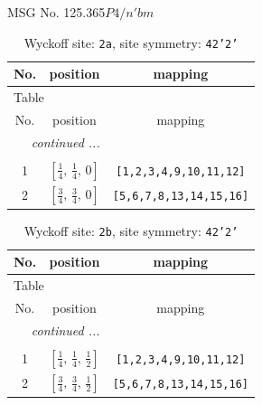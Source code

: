 \documentclass[fleqn,8pt]{jsarticle}
\begin{document}
\setcounter{MaxMatrixCols}{32}

\renewcommand{\tablename}{Table~}
\renewcommand{\figurename}{Figure~}
\begin{center}
\LARGE
MSG No. 125.365\quad$P4/n'bm$
\end{center}
\renewcommand{\arraystretch}{1.2}
\begin{longtable}{ccc}
\caption{Wyckoff site: {\tt 2a}, site symmetry: {\tt 42'2'}}
 \\
 \hline \hline
No. & position & mapping \\ \hline \endfirsthead

\multicolumn{2}{l}{\tablename\ \thetable{}} \\
 \hline \hline
No. & position & mapping \\ \hline \endhead

 \hline \hline
\multicolumn{2}{r}{\footnotesize\it continued ...} \\ \endfoot

 \hline \hline
\multicolumn{2}{r}{} \\ \endlastfoot

1 & $\left[ \frac{1}{4},\, \frac{1}{4},\, 0 \right]$ & {\tt [1,2,3,4,9,10,11,12]} \\ \hline
2 & $\left[ \frac{3}{4},\, \frac{3}{4},\, 0 \right]$ & {\tt [5,6,7,8,13,14,15,16]} \\
\end{longtable}
\renewcommand{\arraystretch}{1.2}
\begin{longtable}{ccc}
\caption{Wyckoff site: {\tt 2b}, site symmetry: {\tt 42'2'}}
 \\
 \hline \hline
No. & position & mapping \\ \hline \endfirsthead

\multicolumn{2}{l}{\tablename\ \thetable{}} \\
 \hline \hline
No. & position & mapping \\ \hline \endhead

 \hline \hline
\multicolumn{2}{r}{\footnotesize\it continued ...} \\ \endfoot

 \hline \hline
\multicolumn{2}{r}{} \\ \endlastfoot

1 & $\left[ \frac{1}{4},\, \frac{1}{4},\, \frac{1}{2} \right]$ & {\tt [1,2,3,4,9,10,11,12]} \\ \hline
2 & $\left[ \frac{3}{4},\, \frac{3}{4},\, \frac{1}{2} \right]$ & {\tt [5,6,7,8,13,14,15,16]} \\
\end{longtable}
\end{document}

